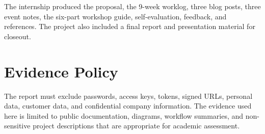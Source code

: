 The internship produced the proposal, the 9-week worklog, three blog posts,
three event notes, the six-part workshop guide, self-evaluation, feedback, and
references. The project also included a final report and presentation material
for closeout.

\section{Evidence Policy}

The report must exclude passwords, access keys, tokens, signed URLs, personal
data, customer data, and confidential company information. The evidence used
here is limited to public documentation, diagrams, workflow summaries, and
non-sensitive project descriptions that are appropriate for academic
assessment.